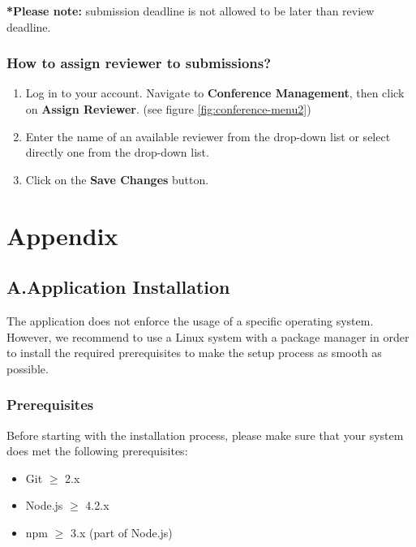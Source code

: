 \documentclass[nochapterpage,nopartpage,noheadingspace,numbersubsubsec,bigchapter,colorback,accentcolor=tud9c,10pt]{tudreport}
\begin{document}
\textbf{*Please note:} submission deadline is not allowed to be later than review deadline.

	\section{How to assign reviewer to submissions?}

\begin{enumerate}
	\item	Log in to your account. Navigate to \textbf{Conference Management}, then click on \textbf{Assign Reviewer}. (see figure \ref{fig:conference-menu2})
	\item	Enter the name of an available reviewer from the drop-down list or select directly one from the drop-down list.
	\item	Click on the \textbf{Save Changes} button.
\end{enumerate}


\part{Appendix}
\label{part:appendix}

  \chapter*{A.\quad Application Installation}
  \label{ch:appendix:setup}

    The application does not enforce the usage of a specific operating system. However, we recommend to use a Linux system with a package manager in order to install the required prerequisites to make the setup process as smooth as possible.

  \section*{Prerequisites}
  \label{sec:appendix:setup:prerequisites}

    Before starting with the installation process, please make sure that your system does met the following prerequisites:
        \begin{multicols}{2}
        \begin{itemize}
            \item Git $\ge$ 2.x
            \item Node.js $\ge$ 4.2.x
            \item npm $\ge$ 3.x (part of Node.js)
        \end{itemize}
        \end{multicols}
\end{document}
